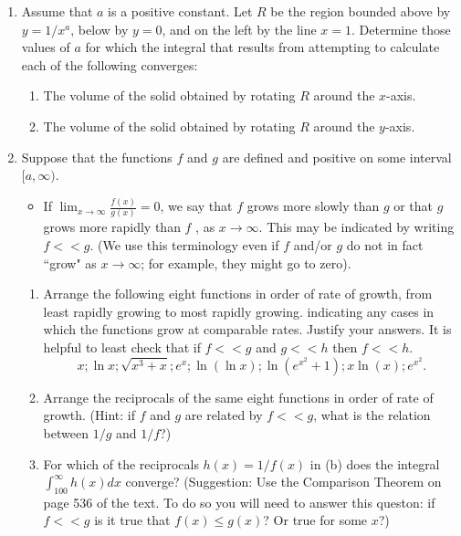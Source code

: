 \documentclass[12pt]{article}
\begin{document}
\begin{enumerate}
\item Assume that $a$ is a positive constant. Let $R$ be the region 
bounded above by $y = 1/x^{a}$, below 
by $y = 0$, and on the left by the line $x = 1$. 
Determine those values of $a$ for which the integral 
that results from attempting to calculate each of the following converges: 

\begin{enumerate}

\item The volume of the solid obtained by rotating $R$ around the $x$-axis.

\item The volume of the solid obtained by rotating $R$ around the $y$-axis. 


\end{enumerate}

\item  Suppose that the functions $f$ and $g$ are defined and 
positive on some interval $[a, \infty)$. 

\begin{itemize}

\item If ${\displaystyle \lim_{x\to \infty} \frac{f(x)}{g(x)}
= 0}$, we say that $f$ grows more slowly than $g$ or that $g$ 
grows more rapidly than 
$f$ , as $x \to \infty$. This may be indicated by writing 
$f << g$. (We use this terminology even if $f$ 
and/or $g$ do not in fact ``grow" as $x \to \infty$; for example, 
they might go to zero). 

\end{itemize}

\begin{enumerate}

\item Arrange the following eight functions in order of rate 
of growth, from least rapidly growing 
to most rapidly growing. indicating any cases in which the 
functions grow at comparable rates. 
Justify your answers. It is helpful to least check that if 
$f << g$ and $g << h$ then $f << h$. 
$$x; \ln x;  \sqrt{x^{3} + x}; e^{x} ; \ln(\ln x); \ln (e^{x^{2}}
+ 1); x \ln(x); e^{x^{2}}.$$

\item Arrange the reciprocals of the same eight functions in order 
of rate of growth. (Hint: if $f$ and $g$ 
are related by $f << g$, what is the relation between $1/g$ and $1/f$?)
 
\item For which of the reciprocals $h(x) = 1/f(x)$ in (b) does the integral 
${\displaystyle \int_{100}^{\infty}
h(x) dx}$ converge? (Suggestion: Use the Comparison Theorem 
on page 536 of the text. To do so you will need to 
answer this queston: if $f << g$ is it true that $f(x) \le g(x)$? 
Or true for some $x$?)

\end{enumerate}






\end{enumerate}
\end{document}
